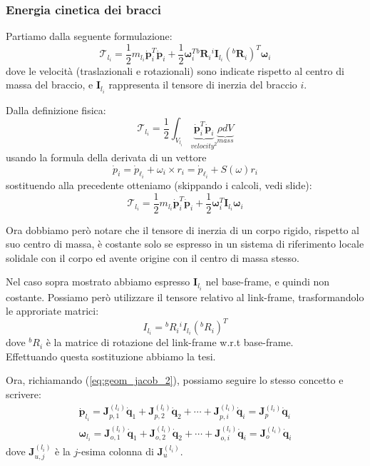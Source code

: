 \subsubsection{Energia cinetica dei bracci}
Partiamo dalla seguente formulazione:
$$
\mathcal{T}_{l_i}
=
\frac{1}{2} m_{l_i} \bm{\dot{p}}_i^T \bm{\dot{p}}_i
+
\frac{1}{2} \bm{\omega}_i^T {}^b\bm{R}_i {}^i\bm{I}_{l_i} ({}^b\bm{R}_i)^T \bm{\omega}_i
$$
dove le velocità (traslazionali e rotazionali) sono indicate rispetto al centro di massa del braccio, e $\bm{I}_{l_i}$ rappresenta il tensore di inerzia del braccio $i$.


\begin{proof2}
Dalla definizione fisica:
$$
\mathcal{T}_{l_i}
=
\frac{1}{2} \int_{V_{l_i}} \underbrace{\bm{\dot{p}}_i^T \bm{\dot{p}}_i}_{\textit{velocity}^2} \underbrace{\rho dV}_{mass}
$$
usando la formula della derivata di un vettore
$$
\dot{p}_i = \dot{p}_{\ell_i} + \omega_i \times r_i = \dot{p}_{\ell_i} + S(\omega)r_i
$$
sostituendo alla precedente otteniamo (skippando i calcoli, vedi slide):
$$
\mathcal{T}_{l_i}
=
\frac{1}{2} m_{l_i} \bm{\dot{p}}_i^T \bm{\dot{p}}_i
+
\frac{1}{2} \bm{\omega}_i^T \bm{I}_{l_i} \bm{\omega}_i
$$

Ora dobbiamo però notare che il tensore di inerzia di un corpo rigido, rispetto al suo centro di massa, è costante solo se espresso in un sistema di riferimento locale solidale con il corpo ed avente origine con il centro di massa stesso.

Nel caso sopra mostrato abbiamo espresso $\bm{I}_{l_i}$ nel base-frame, e quindi non costante. Possiamo però utilizzare il tensore relativo al link-frame, trasformandolo le approriate matrici: 
$$
I_{l_i} = {}^bR_i {}^iI_{l_i} ({}^bR_i)^T
$$
dove ${}^bR_i$ è la matrice di rotazione del link-frame w.r.t base-frame.\\ Effettuando questa sostituzione abbiamo la tesi.
\end{proof2}



Ora, richiamando (\ref{eq:geom_jacob_2}), possiamo seguire lo stesso concetto e scrivere:
\begin{gather*}
\dot{\bm{p}}_{l_i}
=
\bm{J}^{(l_i)}_{p,1}\dot{\bm{q}}_1
+
\bm{J}^{(l_i)}_{p,2}\dot{\bm{q}}_2
+ \cdots +
\bm{J}^{(l_i)}_{p,i}\dot{\bm{q}}_i
=
\bm{J}^{(l_i)}_{p}\dot{\bm{q}}_i
\\
\bm{\omega}_{l_i}
=
\bm{J}^{(l_i)}_{o,1}\dot{\bm{q}}_1
+
\bm{J}^{(l_i)}_{o,2}\dot{\bm{q}}_2
+ \cdots +
\bm{J}^{(l_i)}_{o,i}\dot{\bm{q}}_i
=
\bm{J}^{(l_i)}_{o}\dot{\bm{q}}_i
\end{gather*}
dove $\bm{J}^{(l_i)}_{u,j}$ è la $j$-esima colonna di $\bm{J}^{(l_i)}_{u}$.

